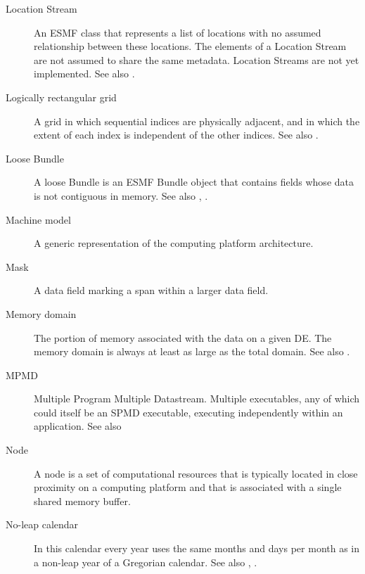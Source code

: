 \begin{description}
\label{glos:LocStream} 
\item[Location Stream] 
  An ESMF class that represents
  a list of locations with no assumed relationship between these locations.  
  The elements of a Location Stream are not assumed to share the same 
  metadata. Location Streams are not yet implemented.
  See also .

\label{glos:RecGrid} 
\item[Logically rectangular grid] 
  A grid in 
  which sequential indices are physically adjacent, and in which the 
  extent of each index is independent of the other indices.
  See also .

\label{glos:LooseBundle} 
\item[Loose Bundle] 
  A loose Bundle 
  is an ESMF Bundle object that contains fields whose data is 
  not contiguous in memory.  See also ,
  .

\item[Machine model] A generic representation of the computing 
  platform architecture.

\label{glos:Mask} 
\item[Mask] 
  A data field marking a span within a larger data field.

\label{glos:MemDomain} 
\item[Memory domain] 
  The portion of memory associated with the data on a given DE.  
  The memory domain is always at least 
  as large as the total domain.  See also .

\label{glos:MPMD} 
\item[MPMD] 
  Multiple Program Multiple Datastream.
  Multiple executables, any of which could itself be an SPMD
  executable, executing independently within an application. 
  See also 

\label{glos:Node} 
\item[Node] 
  A node is a set of computational resources
  that is typically located in close proximity on a computing platform
  and that is associated with a single shared memory buffer.

\label{glos:NoLeap} 
\item [No-leap calendar] 
  In this calendar every year uses the same months 
  and days per month as in a non-leap year of a Gregorian calendar.  See
  also , .


\end{description}
